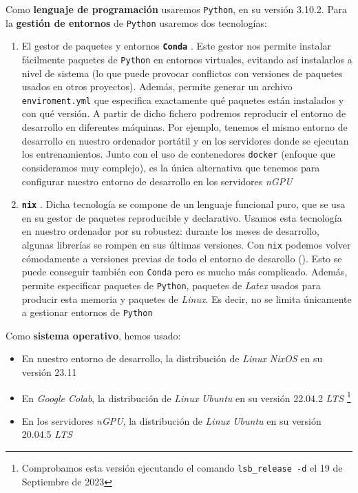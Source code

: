 Como \textbf{lenguaje de programación} usaremos \lstinline{Python}, en su versión 3.10.2. Para la \textbf{gestión de entornos} de \lstinline{Python} usaremos dos tecnologías:

\begin{enumerate}
    \item El gestor de paquetes y entornos \textbf{\lstinline{Conda}} \cite{informatica:conda_web}. Este gestor nos permite instalar fácilmente paquetes de \lstinline{Python} en entornos virtuales, evitando así instalarlos a nivel de sistema (lo que puede provocar conflictos con versiones de paquetes usados en otros proyectos). Además, permite generar un archivo \lstinline{enviroment.yml} que especifica exactamente qué paquetes están instalados y con qué versión. A partir de dicho fichero podremos reproducir el entorno de desarrollo en diferentes máquinas. Por ejemplo, tenemos el mismo entorno de desarrollo en nuestro ordenador portátil y en los servidores donde se ejecutan los entrenamientos. Junto con el uso de contenedores \lstinline{docker} (enfoque que consideramos muy complejo), es la única alternativa que tenemos para configurar nuestro entorno de desarrollo en los servidores \textit{nGPU}
    \item \textbf{\lstinline{nix}} \cite{informatica:nixos_web}. Dicha tecnología se compone de un lenguaje funcional puro, que se usa en su gestor de paquetes reproducible y declarativo. Usamos esta tecnología en nuestro ordenador por su robustez: durante los meses de desarrollo, algunas librerías se rompen en sus últimas versiones. Con \lstinline{nix} podemos volver cómodamente a versiones previas de todo el entorno de desarollo (). Esto se puede conseguir también con \lstinline{Conda} pero es mucho más complicado. Además, permite especificar paquetes de \lstinline{Python}, paquetes de \textit{Latex} usados para producir esta memoria y paquetes de \textit{Linux}. Es decir, no se limita únicamente a gestionar entornos de \lstinline{Python}
\end{enumerate}

Como \textbf{sistema operativo}, hemos usado:

\begin{itemize}
    \item En nuestro entorno de desarrollo, la distribución de \textit{Linux} \textit{NixOS} en su versión 23.11
    \item En \textit{Google Colab}, la distribución de \textit{Linux} \textit{Ubuntu} en su versión 22.04.2 \textit{LTS} \footnote{Comprobamos esta versión ejecutando el comando \lstinline{lsb_release -d} el 19 de Septiembre de 2023}
    \item En los servidores \textit{nGPU}, la distribución de \textit{Linux} \textit{Ubuntu} en su versión 20.04.5 \textit{LTS}
\end{itemize}

